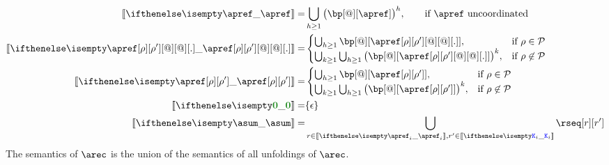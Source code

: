 \begin{align*}
  \ksem{\apref} =
  &
    \bigcup_{h \geq 1}\big(\bp[@][\apref]\big)^h,
  \qquad \text{if $\apref$ uncoordinated}
  \\
  \ksem{\apref[\arole][\arole'][@][@][.]} =
  &
    \begin{cases}
      \bigcup_{h \geq 1}\bp[@][{\apref[\arole][\arole'][@][@][.]}],
      & \text{if } \arole \in \participants %
      \\
      \bigcup_{k \geq 1}\bigcup_{h \geq 1}\big(\bp[@][{\apref[\arole][\arole'][@][@][.]}]\big)^k,
      & \text{if } \arole \not\in \participants %
    \end{cases}
  \\
  \ksem{\apref[\arole][\arole']} =
  &
    \begin{cases}
      \bigcup_{h \geq 1}\bp[@][{\apref[\arole][\arole']}],
      & \text{if } \arole \in \participants %
      \\
      \bigcup_{k \geq 1}\bigcup_{h \geq 1}\big(\bp[@][{\apref[\arole][\arole']}]\big)^k,
      & \text{if } \arole \not\in \participants %
    \end{cases}
  \\
  \ksem{\nil} = & \{ \emptypom \}
  \\
  \ksem \asum = & \bigcup_{\apom \in \ksem{\apref_i},\apom' \in \ksem{\aK_i}} \rseq[\apom][\apom']
\end{align*}
The semantics of $\arec$ is the union of the semantics of all
unfoldings of $\arec$.




